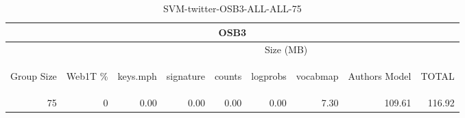 \begin{center}
\begin{table}[htbp] 
 \begin{center}
\begin{tabular}{ | r | r | r | r | r | r | r | r | r |}
\hline
\multicolumn{9}{|c|}{OSB3}\\
\hline
 & & \multicolumn{7}{|c|}{Size (MB)}\\ \cline{3-9}
\begin{sideways}Group Size\end{sideways} & \begin{sideways}Web1T \% \end{sideways} & \begin{sideways}keys.mph\end{sideways} & \begin{sideways}signature\end{sideways} & \begin{sideways}counts\end{sideways} & \begin{sideways}logprobs\end{sideways} & \begin{sideways}vocabmap\end{sideways} & \begin{sideways}Authors Model \end{sideways} & \begin{sideways}TOTAL\end{sideways}\\
\hline
\multirow{0}{*}{75}
 & 0 & 0.00 & 0.00 & 0.00 & 0.00 & 7.30 & 109.61 & 116.92\\ \cline{2-9}
\hline
\end{tabular}
\caption{SVM-twitter-OSB3-ALL-ALL-75}
\label{table:SVM-twitter-OSB3-ALL-ALL-75}
\end{center}
 \end{table}
\end{center}

